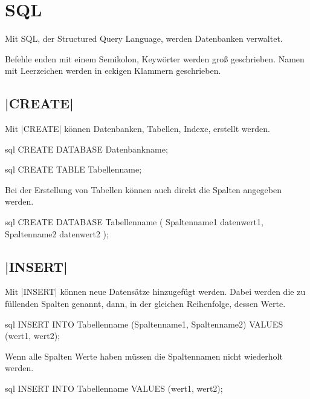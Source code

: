 \documentclass{article}
\begin{document}
\section{SQL} 
Mit SQL, der Structured Query Language, werden Datenbanken verwaltet.

Befehle enden mit einem Semikolon, Keywörter werden groß geschrieben. Namen mit Leerzeichen werden in eckigen Klammern geschrieben.

\subsection{\ilsourcecode[sql]|CREATE|}
Mit \ilsourcecode[sql]|CREATE| können Datenbanken, Tabellen, Indexe, \etc erstellt werden.
\begin{sourcecode}{sql}
CREATE DATABASE Datenbankname;
\end{sourcecode}
\begin{sourcecode}{sql}
CREATE TABLE Tabellenname;
\end{sourcecode}
Bei der Erstellung von Tabellen können auch direkt die Spalten angegeben werden.
\begin{sourcecode}{sql}
CREATE DATABASE Tabellenname (
    Spaltenname1 datenwert1,
    Spaltenname2 datenwert2
);
\end{sourcecode}

\subsection{\ilsourcecode[sql]|INSERT|}
Mit \ilsourcecode[sql]|INSERT| können neue Datensätze hinzugefügt werden. Dabei werden die zu füllenden Spalten genannt, dann, in der gleichen Reihenfolge, dessen Werte.
\begin{sourcecode}{sql}
INSERT INTO Tabellenname (Spaltenname1, Spaltenname2) VALUES (wert1, wert2);
\end{sourcecode}
Wenn alle Spalten Werte haben müssen die Spaltennamen nicht wiederholt werden.
\begin{sourcecode}{sql}
INSERT INTO Tabellenname VALUES (wert1, wert2);
\end{sourcecode}
\end{document}
